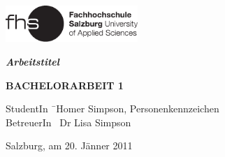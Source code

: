 \begin{titlepage}
\begin{center}

\includegraphics[width=5cm]{images/FHSLogo.pdf}

\vspace*{4cm}

\Large{
	\textit{\textbf{Arbeitstitel}}
}

\vspace*{4cm}

\large{
	\textbf{BACHELORARBEIT 1}
}

\end{center}

\vfill

\begin{tabbing}
StudentIn \= \ Homer Simpson, Personenkennzeichen \\
BetreuerIn \> \ Dr Lisa Simpson
\end{tabbing}

Salzburg, am 20. Jänner 2011

\end{titlepage}
